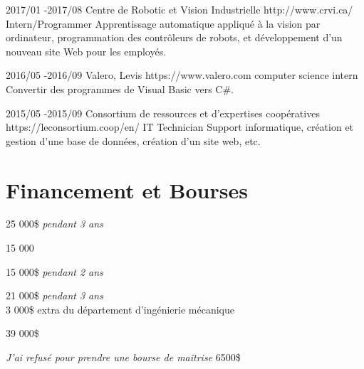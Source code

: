 \documentclass[10pt]{article} %
\begin{document}

\job
{2017/01 -}{2017/08}
{Centre de Robotic et Vision Industrielle}
{http://www.crvi.ca/}
{Intern/Programmer}
{Apprentissage automatique appliqué à la vision par ordinateur, programmation des contrôleurs de robots, et développement d'un nouveau
site Web pour les employés.}

\job
{2016/05 -}{2016/09}
{Valero, Levis}
{https://www.valero.com}
{computer science intern}
{Convertir des programmes de Visual Basic vers C\#.}

\job
{2015/05 -}{2015/09}
{Consortium de ressources et d'expertises coopératives}
{https://leconsortium.coop/en/}
{IT Technician}
{Support informatique, création et gestion d'une base de données, création d'un site web, etc.}


\section{Financement et Bourses}

{
 25 000\$  \textit{pendant 3 ans}\\
}

{
 15 000 \\
}

{
 15 000\$ \textit{pendant 2 ans} \\
}

{
 21 000\$ \textit{pendant 3 ans} \\
 3 000\$ extra du département d'ingénierie mécanique\\
}

{
\textit{} 39 000\$\\
}

{
\textit{J'ai refusé pour prendre une bourse de maîtrise} 6500\$\\
}
\end{document}
